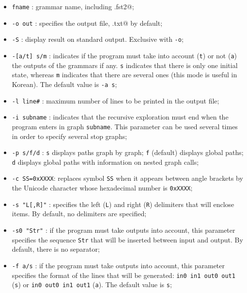 \begin{itemize}
  \item \verb$fname$ : grammar name, including \verb@.fst2@;
  \item \verb$-o out$ : specifies the output file, \verb@lst.txt@ by default;
  \item \verb$-S$ : display result on standard output. Exclusive with \verb$-o$;
  \item \verb$-[a/t] s/m$ : indicates if the program must take into account
  (\verb$t$) or not (\verb$a$) the outputs of the grammars if any. \verb$s$
  indicates that there is only one initial state, whereas \verb$m$ indicates that
  there are several ones (this mode is useful in Korean). The default value is
  \verb$-a s$;

  \item \verb$-l line#$ : maximum number of lines to be printed in the output file;
  \item \verb$-i subname$ : indicates that the recursive exploration must end
  when the program enters in graph \verb$subname$. This parameter can be used
  several times in order to specify several stop graphs;

  \item \verb$-p s/f/d$ : \verb$s$ displays paths graph by graph; \verb$f$
  (default) displays global paths; \verb$d$ displays global paths with
  information on nested graph calls;

  \item \verb$-c SS=0xXXXX$: replaces symbol \verb$SS$ when it appears between
  angle brackets by the Unicode character whose hexadecimal number is
  \verb$0xXXXX$;

  \item \verb$-s "L[,R]"$ : specifies the left (\verb$L$) and right (\verb$R$)
  delimiters that will enclose items. By default, no delimiters are specified;

  \item \verb$-s0 "Str"$ : if the program must take  outputs into account, this
  parameter specifies the sequence \verb$Str$ that will be inserted between input
  and output. By default, there is no separator;

  \item \verb$-f a/s$ : if the program must take  outputs into account, this
  parameter specifies the format of the lines that will be generated:
  \verb$in0 in1 out0 out1$ (\verb$s$) or \verb$in0 out0 in1 out1$ (\verb$a$). The default
  value is \verb$s$;
  

\end{itemize}
